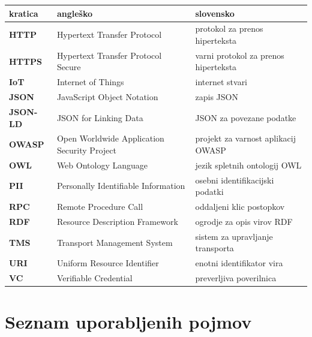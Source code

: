 \newpage
\thispagestyle{empty}
\begin{table}[ht]
  \centering
  \small
  \setlength{\tabcolsep}{6pt} %
  \begin{tabularx}{\textwidth}{l|X|X}
    \textbf{kratica} & \textbf{angleško} & \textbf{slovensko} \\ \hline
    \textbf{HTTP}    & Hypertext Transfer Protocol              & protokol za prenos hiperteksta \\
    \textbf{HTTPS}   & Hypertext Transfer Protocol Secure       & varni protokol za prenos hiperteksta \\
    \textbf{IoT}     & Internet of Things                       & internet stvari \\
    \textbf{JSON}    & JavaScript Object Notation               & zapis JSON \\
    \textbf{JSON-LD} & JSON for Linking Data                    & JSON za povezane podatke \\
    \textbf{OWASP}   & Open Worldwide Application Security Project & projekt za varnost aplikacij OWASP \\
    \textbf{OWL}     & Web Ontology Language                    & jezik spletnih ontologij OWL \\
    \textbf{PII}     & Personally Identifiable Information      & osebni identifikacijski podatki \\
    \textbf{RPC}     & Remote Procedure Call                    & oddaljeni klic postopkov \\
    \textbf{RDF}     & Resource Description Framework           & ogrodje za opis virov RDF \\
    \textbf{TMS}     & Transport Management System              & sistem za upravljanje transporta \\
    \textbf{URI}     & Uniform Resource Identifier              & enotni identifikator vira \\
    \textbf{VC}      & Verifiable Credential                    & preverljiva poverilnica \\
  \end{tabularx}
\end{table}

\newpage
\chapter*{Seznam uporabljenih pojmov}
\thispagestyle{empty}

